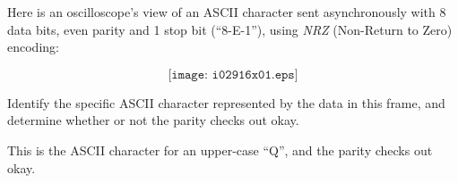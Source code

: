 

Here is an oscilloscope's view of an ASCII character sent asynchronously with 8 data bits, even parity and 1 stop bit (``8-E-1''), using {\it NRZ} (Non-Return to Zero) encoding:

$$\texttt{[image: i02916x01.eps]}$$

Identify the specific ASCII character represented by the data in this frame, and determine whether or not the parity checks out okay.







This is the ASCII character for an upper-case ``Q'', and the parity checks out okay.











